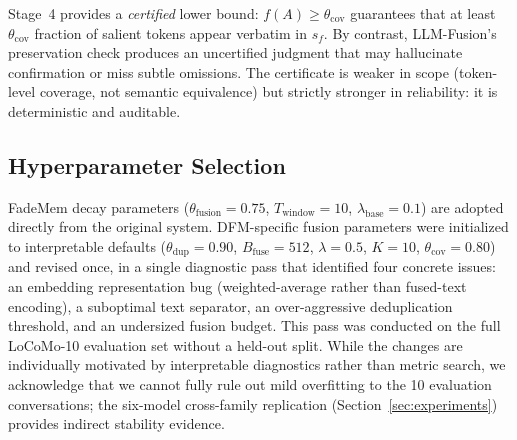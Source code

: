 \begin{remark}
\label{rem:cert}
Stage~4 provides a \emph{certified} lower bound: $f(A) \geq \theta_{\mathrm{cov}}$ guarantees that at least $\theta_{\mathrm{cov}}$ fraction of salient tokens appear verbatim in $s_f$.
By contrast, LLM-Fusion's preservation check produces an uncertified judgment that may hallucinate confirmation or miss subtle omissions.
The certificate is weaker in scope (token-level coverage, not semantic equivalence) but strictly stronger in reliability: it is deterministic and auditable.
\end{remark}

\subsection{Hyperparameter Selection}

FadeMem decay parameters ($\theta_\text{fusion}=0.75$, $T_\text{window}=10$, $\lambda_\text{base}=0.1$) are adopted directly from the original system. DFM-specific fusion parameters were initialized to interpretable defaults ($\theta_\text{dup}=0.90$, $B_\text{fuse}=512$, $\lambda=0.5$, $K=10$, $\theta_\text{cov}=0.80$) and revised once, in a single diagnostic pass that identified four concrete issues: an embedding representation bug (weighted-average rather than fused-text encoding), a suboptimal text separator, an over-aggressive deduplication threshold, and an undersized fusion budget. This pass was conducted on the full LoCoMo-10 evaluation set without a held-out split. While the changes are individually motivated by interpretable diagnostics rather than metric search, we acknowledge that we cannot fully rule out mild overfitting to the 10 evaluation conversations; the six-model cross-family replication (Section~\ref{sec:experiments}) provides indirect stability evidence.
